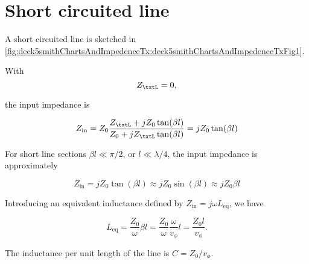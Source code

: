 %
%

\section{Short circuited line}

A short circuited line is sketched in \cref{fig:deck5smithChartsAndImpedenceTx:deck5smithChartsAndImpedenceTxFig1}.


With 
\begin{equation}\label{eqn:uwavesDeck5SmithChartCore:20}
Z_\txtL = 0,
\end{equation}

the input impedance is

\begin{equation}\label{eqn:uwavesDeck5SmithChartCore:40}
Z_{\textrm{in}} 
= Z_0 \frac{ Z_\txtL + j Z_0 \tan(\beta l) }{ Z_0 + j Z_\txtL \tan(\beta l)}
= j Z_0 \tan(\beta l)
\end{equation}

%
%

For short line sections \( \beta l \ll \pi/2 \), or \( l \ll \lambda/4 \), the input impedance is approximately

\begin{dmath}\label{eqn:uwavesDeck5SmithChartCore:80}
Z_{\textrm{in}} 
= j Z_0 \tan(\beta l)
\approx j Z_0 \sin(\beta l)
\approx j Z_0 \beta l
\end{dmath}

Introducing an equivalent inductance defined by \( Z_{\textrm{in}} = j \omega L_{\mathrm{eq}} \), we have

\begin{dmath}\label{eqn:uwavesDeck5SmithChartCore:100}
L_{\mathrm{eq}}
=
\frac{Z_0}{\omega} \beta l 
=
\frac{Z_0}{\omega} \frac{\omega}{v_\phi} l 
=
\frac{Z_0 l}{v_\phi}.
\end{dmath}

The inductance per unit length of the line is \( C = Z_0/v_\phi \).  

